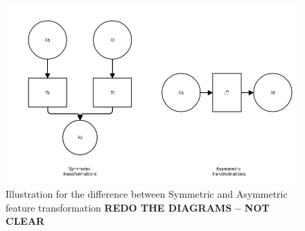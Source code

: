   \begin{figure}[!htbp]
  \centering
  \includegraphics[scale=0.4]{images/sota/feature_transformation.png}
  \caption[Symmetric and Asymmetric transfer]{Illustration for the difference between Symmetric and Asymmetric feature transformation \textbf{REDO THE DIAGRAMS -- NOT CLEAR}}
  \label{fig:feature_transformation}
  \end{figure}

